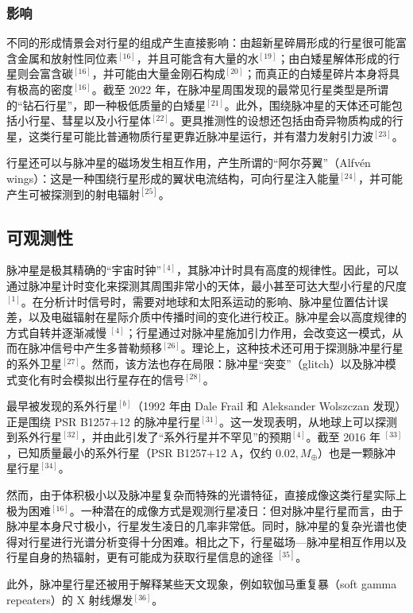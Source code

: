 \subsubsection{影响}
不同的形成情景会对行星的组成产生直接影响：由超新星碎屑形成的行星很可能富含金属和放射性同位素$^{[16]}$，并且可能含有大量的水$^{[19]}$；由白矮星解体形成的行星则会富含碳$^{[16]}$，并可能由大量金刚石构成$^{[20]}$；而真正的白矮星碎片本身将具有极高的密度$^{[16]}$。截至 2022 年，在脉冲星周围发现的最常见行星类型是所谓的“钻石行星”，即一种极低质量的白矮星$^{[21]}$。此外，围绕脉冲星的天体还可能包括小行星、彗星以及小行星体$^{[22]}$。更具推测性的设想还包括由奇异物质构成的行星，这类行星可能比普通物质行星更靠近脉冲星运行，并有潜力发射引力波$^{[23]}$。

行星还可以与脉冲星的磁场发生相互作用，产生所谓的“阿尔芬翼”（Alfvén wings）：这是一种围绕行星形成的翼状电流结构，可向行星注入能量$^{[24]}$，并可能产生可被探测到的射电辐射$^{[25]}$。
\subsection{可观测性}
脉冲星是极其精确的“宇宙时钟”$^{[4]}$，其脉冲计时具有高度的规律性。因此，可以通过脉冲星计时变化来探测其周围非常小的天体，最小甚至可达大型小行星的尺度$^{[1]}$。在分析计时信号时，需要对地球和太阳系运动的影响、脉冲星位置估计误差，以及电磁辐射在星际介质中传播时间的变化进行校正。脉冲星会以高度规律的方式自转并逐渐减慢 $^{[4]}$；行星通过对脉冲星施加引力作用，会改变这一模式，从而在脉冲信号中产生多普勒频移$^{[26]}$。理论上，这种技术还可用于探测脉冲星行星的系外卫星$^{[27]}$。然而，该方法也存在局限：脉冲星“突变”（glitch）以及脉冲模式变化有时会模拟出行星存在的信号$^{[28]}$。

最早被发现的系外行星$^{[b]}$（1992 年由 Dale Frail 和 Aleksander Wolszczan 发现）正是围绕 PSR B1257+12 的脉冲星行星$^{[31]}$。这一发现表明，从地球上可以探测到系外行星$^{[32]}$，并由此引发了“系外行星并不罕见”的预期$^{[4]}$。截至 2016 年 $^{[33]}$，已知质量最小的系外行星（PSR B1257+12 A，仅约 $0.02,M_{\oplus}$）也是一颗脉冲星行星$^{[34]}$。

然而，由于体积极小以及脉冲星复杂而特殊的光谱特征，直接成像这类行星实际上极为困难$^{[16]}$。一种潜在的成像方式是观测行星凌日：但对脉冲星行星而言，由于脉冲星本身尺寸极小，行星发生凌日的几率非常低。同时，脉冲星的复杂光谱也使得对行星进行光谱分析变得十分困难。相比之下，行星磁场—脉冲星相互作用以及行星自身的热辐射，更有可能成为获取行星信息的途径 $^{[35]}$。

此外，脉冲星行星还被用于解释某些天文现象，例如软伽马重复暴（soft gamma repeaters）的 X 射线爆发$^{[36]}$。

